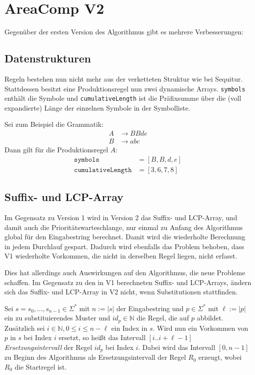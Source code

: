 \section{AreaComp V2}


Gegenüber der ersten Version des Algorithmus gibt es mehrere Verbesserungen:

\subsection{Datenstrukturen} Regeln bestehen nun nicht mehr aus der verketteten Struktur wie bei Sequitur. Stattdessen besitzt eine Produktionsregel nun zwei dynamische Arrays. \texttt{symbols} enthält die Symbole und \texttt{cumulativeLength} ist die Präfixsumme über die (voll expandierte) Länge der einzelnen Symbole in der Symbolliste.

Sei zum Beispiel die Grammatik: 
\begin{align*}
	A &\rightarrow BBde\\
	B &\rightarrow abc
\end{align*}
Dann gilt für die Produktionsregel $A$: 
\begin{align*}
	\texttt{symbols} &= [B, B, d, e]\\
	\texttt{cumulativeLength} &= [3, 6, 7, 8]
\end{align*}

\subsection{Suffix- und LCP-Array}
Im Gegensatz zu Version 1 wird in Version 2 das Suffix- und LCP-Array, und damit auch die Prioritätswarteschlange, nur einmal zu Anfang des Algorithmus global für den Eingabestring berechnet. Damit wird die wiederholte Berechnung in jedem Durchlauf gespart. 
Dadurch wird ebenfalls das Problem behoben, dass V1 wiederholte Vorkommen, die nicht in derselben Regel liegen, nicht erfasst.

Dies hat allerdings auch Auswirkungen auf den Algorithmus, die neue Probleme schaffen. Im Gegensatz zu den in V1 berechneten Suffix- und LCP-Arrays, ändern sich das Suffix- und LCP-Array in V2 nicht, wenn Substitutionen stattfinden. 

Sei $s = s_0, \dots, s_{n-1} \in \Sigma^*$ mit $n := |s|$ der Eingabestring und $p \in \Sigma^*$ mit $\ell := |p|$  ein zu substituierendes Muster und $id_p \in \mathbb{N}$ die Regel, die auf $p$ abbildet. Zusätzlich sei $i \in \mathbb{N}, 0 \leq i \leq n - \ell$ ein Index in $s$. Wird nun ein Vorkommen von $p$ in $s$ bei Index $i$ ersetzt, so heißt das Intervall $[i.. i + \ell - 1]$ \emph{Ersetzungsintervall} der Regel $id_p$ bei Index $i$. Dabei wird das Intervall $[0, n-1]$ zu Beginn des Algorithmus als Ersetzungsintervall der Regel $R_0$ erzeugt, wobei $R_0$ die Startregel ist.

